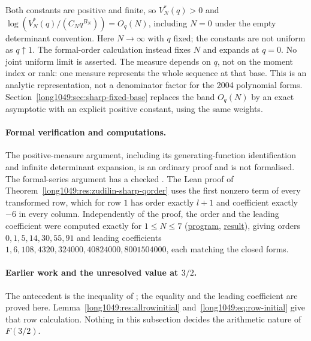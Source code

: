 \documentclass[11pt]{article}
\begin{document}
Both constants are positive and finite, so $V_N^*(q)>0$ and
$\log(V_N^*(q)/(C_Nq^{B_N}))=O_q(N)$, including $N=0$ under the empty
determinant convention.
Here $N\to\infty$ with $q$ fixed; the constants are not uniform as
$q\uparrow1$. The formal-order calculation instead fixes $N$ and expands
at $q=0$. No joint uniform limit is asserted. The measure depends on $q$, not on the moment index or rank: one
measure represents the whole sequence at that base. This is an
analytic representation, not a denominator factor for the 2004
polynomial forms.
Section~\ref{long1049:sec:sharp-fixed-base} replaces the band $O_q(N)$ by an
exact asymptotic with an explicit positive constant, using the same weights.

\paragraph{Formal verification and computations.}
The positive-measure argument, including its generating-function
identification and infinite determinant expansion, is an ordinary proof
and is not formalised. The formal-series argument has a checked
.
The Lean proof of Theorem~\ref{long1049:res:zudilin-sharp-qorder} uses
the first nonzero term of every transformed row, which
for row $1$ has order exactly $l+1$ and coefficient exactly $-6$ in every
column.  Independently of the proof, the order and the
leading coefficient were computed exactly for $1\le N\le7$
(\href{https://github.com/wcook04/plectis-erdos/blob/f5c9e560df38cd32e9b49473a409384aab00d9ae/research/experiments/erdos1049/hankel_qorder.py}{program}, \href{https://github.com/wcook04/plectis-erdos/blob/f5c9e560df38cd32e9b49473a409384aab00d9ae/research/experiments/erdos1049/receipts/hankel-qorder.json}{result}), giving orders
$0,1,5,14,30,55,91$ and leading coefficients
$1,6,108,4320,324000,40824000,8001504000$, each matching the closed forms.

\paragraph{Earlier work and the unresolved value at $3/2$.}
The antecedent is the inequality of \cite[Sec.~4, p.~7]{zudilin2016}; the equality and
the leading coefficient are proved here.
Lemma~\ref{long1049:res:allrowinitial} and~\eqref{long1049:eq:row-initial}
give that row calculation.  Nothing in
this subsection decides the arithmetic nature of $F(3/2)$.
\end{document}
